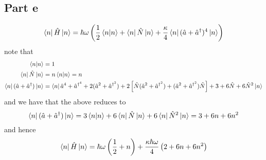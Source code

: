 \documentclass[12pt]{report}
\begin{document}
\subsection*{Part e}
\begin{equation*}
  \bra{n}\hat{H} \ket{n} = \hbar \omega \left(\frac{1}{2} \braket{n|n} + \bra{n}\hat{N}\ket{n} + \frac{\kappa}{4} \bra{n}(\hat{a} + \hat{a}^\dagger)^4 \ket{n}\right)
\end{equation*}
note that
\begin{align*}
  \braket{n|n} &= 1 \\
  \bra{n} \hat{N} \ket{n} &= n \braket{n|n} = n \\
  \bra{n} (\hat{a} + \hat{a}^\dagger) \ket{n} &= \bra{n}\hat{a}^4 + \hat{a}^{\dagger^4} + 2 (\hat{a}^2 + \hat{a}^{\dagger^2}) + 2\left[\hat{N}(\hat{a}^2 + \hat{a}^{\dagger^2}) + (\hat{a}^2 + \hat{a}^{\dagger^2})\hat{N}\right] + 3 + 6\hat{N} + 6\hat{N}^2 \ket{n} 
\end{align*}
and we have that the above reduces to
\begin{equation*}
  \bra{n} (\hat{a} + \hat{a}^\dagger) \ket{n} = 3 \braket{n|n} + 6\bra{n}\hat{N}\ket{n} + 6\bra{n}\hat{N}^2\ket{n} = 3 + 6n + 6n^2
\end{equation*}
and hence
\begin{equation*}
  \bra{n} \hat{H} \ket{n} = \hbar\omega \left(\frac{1}{2} + n\right) + \frac{\kappa \hbar \omega}{4} \left(2 + 6n + 6n^2\right)
\end{equation*}
\end{document}
